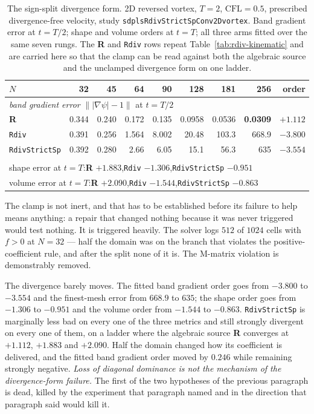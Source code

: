 \documentclass[preprint,3p,11pt]{elsarticle}
\newcommand{\psilev}{\psi}
\newcommand{\gradpsi}{\lvert\nabla\psilev\rvert}
\begin{document}
\begin{table}[htbp]
\centering
\caption{The sign-split divergence form. 2D reversed vortex, $T=2$,
$\mathrm{CFL}=0.5$, prescribed divergence-free velocity, study
\texttt{sdplsRdivStrictSpConv2Dvortex}. Band gradient error at $t=T/2$; shape and
volume orders at $t=T$; all three arms fitted over the same seven rungs. The
\textbf{R} and \texttt{Rdiv} rows repeat Table~\ref{tab:rdiv-kinematic} and are
carried here so that the clamp can be read against both the algebraic source and
the unclamped divergence form on one ladder.}
\label{tab:rdiv-strictsp}
\small
\begin{tabular}{lrrrrrrrr}
\toprule
$N$ & 32 & 45 & 64 & 90 & 128 & 181 & 256 & order \\
\midrule
\multicolumn{9}{l}{\emph{band gradient error} $\bigl\|\gradpsi-1\bigr\|$ at $t=T/2$}\\
\textbf{R}            & 0.344 & 0.240 & 0.172 & 0.135 & 0.0958 & 0.0536 & \textbf{0.0309} & $\mathbf{+1.112}$ \\
\texttt{Rdiv}         & 0.391 & 0.256 & 1.564 & 8.002 & 20.48 & 103.3 & 668.9 & $-3.800$ \\
\texttt{RdivStrictSp} & 0.392 & 0.280 & 2.66  & 6.05  & 15.1  & 56.3  & 635   & $-3.554$ \\
\addlinespace
\multicolumn{9}{l}{\emph{fitted orders of the other two metrics}}\\
\multicolumn{9}{l}{shape error at $t=T$:\quad \textbf{R} $+1.883$,\quad \texttt{Rdiv} $-1.306$,\quad \texttt{RdivStrictSp} $-0.951$} \\
\multicolumn{9}{l}{volume error at $t=T$:\quad \textbf{R} $+2.090$,\quad \texttt{Rdiv} $-1.544$,\quad \texttt{RdivStrictSp} $-0.863$} \\
\bottomrule
\end{tabular}
\end{table}

The clamp is not inert, and that has to be established before its failure to help
means anything: a repair that changed nothing because it was never triggered would
test nothing. It is triggered heavily. The solver logs $512$ of $1024$ cells with
$f > 0$ at $N=32$ --- half the domain was on the branch that violates the
positive-coefficient rule, and after the split none of it is. The M-matrix
violation is demonstrably removed.

The divergence barely moves. The fitted band gradient order goes from $-3.800$ to
$-3.554$ and the finest-mesh error from $668.9$ to $635$; the shape order goes
from $-1.306$ to $-0.951$ and the volume order from $-1.544$ to $-0.863$.
\texttt{RdivStrictSp} is marginally less bad on every one of the three metrics and
still strongly divergent on every one of them, on a ladder where the algebraic
source \textbf{R} converges at $+1.112$, $+1.883$ and $+2.090$. Half the domain
changed how its coefficient is delivered, and the fitted band gradient order moved
by $0.246$ while remaining strongly negative. \emph{Loss of diagonal dominance is not the mechanism of
the divergence-form failure.} The first of the two hypotheses of the previous
paragraph is dead, killed by the experiment that paragraph named and in the
direction that paragraph said would kill it.
\end{document}
